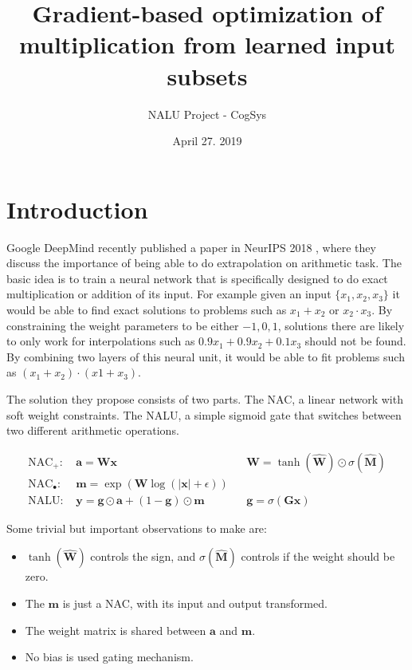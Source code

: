 \documentclass[a4paper]{article}
\begin{document}
\title{Gradient-based optimization of multiplication from learned input subsets}
\author{NALU Project - CogSys}
\date{April 27. 2019}
\maketitle

\section{Introduction}

Google DeepMind recently published a paper in NeurIPS 2018 \cite{nalu}, where they discuss the importance of being able to do extrapolation on arithmetic task. The basic idea is to train a neural network that is specifically designed to do exact multiplication or addition of its input. For example given an input $\{x_1, x_2, x_3\}$ it would be able to find exact solutions to problems such as $x_1 + x_2$ or $x_2 \cdot x_3$. By constraining the weight parameters to be either ${-1, 0, 1}$, solutions there are likely to only work for interpolations such as $0.9 x_1 + 0.9 x_2 + 0.1 x_3$ should not be found. By combining two layers of this neural unit, it would be able to fit problems such as $(x_1 + x_2) \cdot (x1 + x_3)$.

The solution they propose consists of two parts. The NAC, a linear network with soft weight constraints. The NALU, a simple sigmoid gate that switches between two different arithmetic operations.

\begin{equation}
\begin{aligned}
\textrm{NAC}_+:\ &\mathbf{a} = \mathbf{W} \mathbf{x} && \mathbf{W} = \tanh(\hat{\mathbf{W}}) \odot \sigma(\hat{\mathbf{M}}) \\
\textrm{NAC}_\bullet:\ & \mathbf{m} = \exp(\mathbf{W} \log(|\mathbf{x}| + \epsilon)) \\
\textrm{NALU}:\ &\mathbf{y} = \mathbf{g} \odot \mathbf{a} + (1 - \mathbf{g}) \odot \mathbf{m} && \mathbf{g} = \sigma(\mathbf{G} \mathbf{x})
\end{aligned}
\end{equation}

Some trivial but important observations to make are:

\begin{itemize}
\item $\tanh(\hat{\mathbf{W}})$ controls the sign, and $\sigma(\hat{\mathbf{M}})$ controls if the weight should be zero.
\item The $\mathbf{m}$ is just a NAC, with its input and output transformed.
\item The weight matrix is shared between $\mathbf{a}$ and $\mathbf{m}$.
\item No bias is used gating mechanism.
\end{itemize}
\end{document}
